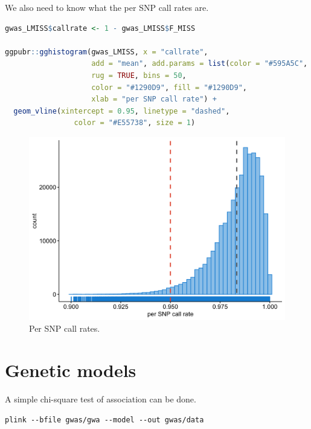\documentclass[
]{book}
\begin{document}
We also need to know what the per SNP call rates are.

\begin{lstlisting}[language=R]
gwas_LMISS$callrate <- 1 - gwas_LMISS$F_MISS

ggpubr::gghistogram(gwas_LMISS, x = "callrate",
                    add = "mean", add.params = list(color = "#595A5C", linetype = "dashed", size = 1),
                    rug = TRUE, bins = 50,
                    color = "#1290D9", fill = "#1290D9",
                    xlab = "per SNP call rate") +
  geom_vline(xintercept = 0.95, linetype = "dashed",
                color = "#E55738", size = 1)
\end{lstlisting}

\begin{figure}

{\centering \includegraphics[width=18.67in]{img/show-snp-callrate-gwas} 

}

\caption{Per SNP call rates.}\label{fig:show-snp-callrate-gwas}
\end{figure}

\hypertarget{genetic-models}{%
\section{Genetic models}\label{genetic-models}}

A simple chi-square test of association can be done.

\begin{lstlisting}
plink --bfile gwas/gwa --model --out gwas/data
\end{lstlisting}
\end{document}
